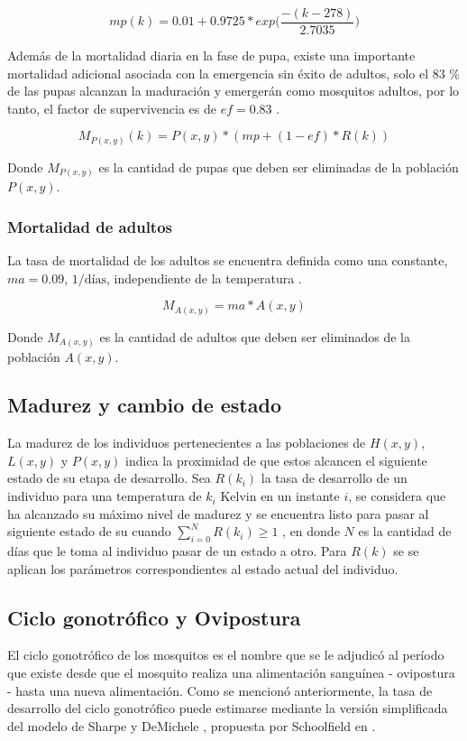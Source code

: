 \begin{equation}
\label{eq:mortalidad-natural-pupas}
    mp(k) = 0.01 + 0.9725 * exp\bigg( \frac{-(k - 278)}{2.7035}\bigg)
\end{equation}

Además de la mortalidad diaria en la fase de pupa, existe una importante mortalidad adicional
asociada con la emergencia sin éxito de adultos, solo el 83 \%  de las pupas alcanzan la maduración
y emergerán como mosquitos adultos, por lo tanto, el factor de supervivencia es de $ef = 0.83$
\cite{otero2006stochastic}.

\begin{equation}
    M_{P(x,y)}(k) = P(x,y) * (mp + (1 - ef) * R(k))
\end{equation}

Donde $M_{P(x,y)}$ es la cantidad de pupas que deben ser eliminadas de la población $P(x,y)$.

\subsubsection{Mortalidad de adultos}
La tasa de mortalidad de los adultos se encuentra definida como una constante, $ma = 0.09$,
$1/\text{días}$, independiente de la temperatura \cite{otero2006stochastic}.

\begin{equation}
    M_{A(x,y)} = ma * A(x,y)
\end{equation}

Donde $M_{A(x,y)}$ es la cantidad de adultos que deben ser eliminados de la población $A(x,y)$.

\subsection{Madurez y cambio de estado}
La madurez de los individuos pertenecientes a las poblaciones de $H(x,y)$, $L(x,y)$ y $P(x,y)$
indica la proximidad de que estos alcancen el siguiente estado de su etapa de desarrollo. Sea
$R(k_{i})$ la tasa de desarrollo de un individuo para una temperatura de $k_{i}$ Kelvin en un
instante $i$, se considera que ha alcanzado su máximo nivel de madurez y se encuentra listo para
pasar al siguiente estado de su cuando $\sum_{i=0}^{N} R(k_{i}) \geq 1$ , en donde $N$ es la
cantidad de días que le toma al individuo pasar de un estado a otro. Para $R(k)$ se se aplican los
parámetros correspondientes al estado actual del individuo.

\subsection{Ciclo gonotrófico y Ovipostura}
El ciclo gonotrófico de los mosquitos es el nombre que se le adjudicó al período que existe desde
que el mosquito realiza una alimentación sanguínea - ovipostura - hasta una nueva alimentación.
Como se mencionó anteriormente, la tasa de desarrollo del ciclo gonotrófico puede estimarse
mediante la versión simplificada del modelo de Sharpe y DeMichele \cite{sharpe1977reaction},
propuesta por Schoolfield en \cite{schoolfield1981non}.

